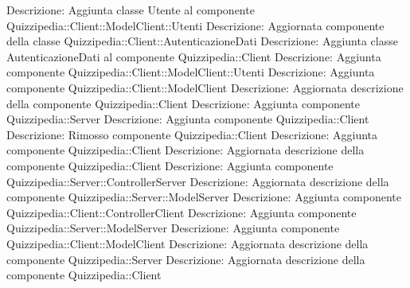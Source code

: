 Descrizione: Aggiunta classe Utente al componente Quizzipedia::Client::ModelClient::Utenti 
Descrizione: Aggiornata componente della classe Quizzipedia::Client::AutenticazioneDati 
Descrizione: Aggiunta classe AutenticazioneDati al componente Quizzipedia::Client 
Descrizione: Aggiunta componente Quizzipedia::Client::ModelClient::Utenti 
Descrizione: Aggiunta componente Quizzipedia::Client::ModelClient 
Descrizione: Aggiornata descrizione della componente Quizzipedia::Client 
Descrizione: Aggiunta componente Quizzipedia::Server 
Descrizione: Aggiunta componente Quizzipedia::Client 
Descrizione: Rimosso componente Quizzipedia::Client 
Descrizione: Aggiunta componente Quizzipedia::Client 
Descrizione: Aggiornata descrizione della componente Quizzipedia::Client 
Descrizione: Aggiunta componente Quizzipedia::Server::ControllerServer 
Descrizione: Aggiornata descrizione della componente Quizzipedia::Server::ModelServer 
Descrizione: Aggiunta componente Quizzipedia::Client::ControllerClient 
Descrizione: Aggiunta componente Quizzipedia::Server::ModelServer 
Descrizione: Aggiunta componente Quizzipedia::Client::ModelClient 
Descrizione: Aggiornata descrizione della componente Quizzipedia::Server 
Descrizione: Aggiornata descrizione della componente Quizzipedia::Client 

